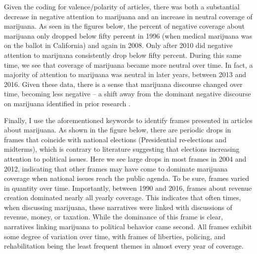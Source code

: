 Given the coding for valence/polarity of articles, there was both a substantial decrease in negative attention to marijuana and an increase in neutral coverage of marijuana. As seen in the figures below, the percent of negative coverage about marijuana only dropped below fifty percent in 1996 (when medical marijuana was on the ballot in California) and again in 2008. Only after 2010 did negative attention to marijuana consistently drop below fifty percent. During this same time, we see that coverage of marijuana became more neutral over time. In fact, a majority of attention to marijuana was neutral in later years, between 2013 and 2016. Given these data, there is a sense that marijuana discourse changed over time, becoming less negative -- a shift away from the dominant negative discourse on marijuana identified in prior research \citep{mosher_and_akins_2019,bonnie_and_whitebread_1970}. 






Finally, I use the aforementioned keywords to identify frames presented in articles about marijuana. As shown in the figure below, there are periodic drops in frames that coincide with national elections (Presidential re-elections and midterms), which is contrary to literature suggesting that elections increasing attention to political issues. Here we see large drops in most frames in 2004 and 2012, indicating that other frames may have come to dominate marijuana coverage when national issues reach the public agenda. To be sure, frames varied in quantity over time. Importantly, between 1990 and 2016, frames about revenue creation dominated nearly all yearly coverage. This indicates that often times, when discussing marijuana, these narratives were linked with discussions of revenue, money, or taxation. While the dominance of this frame is clear, narratives linking marijuana to political behavior came second. All frames exhibit some degree of variation over time, with frames of liberties, policing, and rehabilitation being the least frequent themes in almost every year of coverage. 




